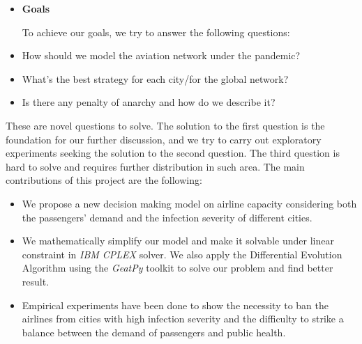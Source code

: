 \begin{itemize}    
    \item \textbf{Goals}
    
    To achieve our goals, we try to answer the following questions:
\end{itemize}



\begin{itemize}    
    \item How should we model the aviation network under the pandemic?
    \item What's the best strategy for each city/for the global network?
    \item Is there any penalty of anarchy and how do we describe it?
\end{itemize}


These are novel questions to solve. The solution to the first question is the foundation for our further discussion, and we try to carry out exploratory experiments seeking the solution to the second question. The third question is hard to solve and requires further distribution in such area. The main contributions of this project are the following:
\begin{itemize}
    \item We propose a new decision making model on airline capacity considering both the passengers' demand and the infection severity of different cities.
    \item We mathematically simplify our model and make it solvable under linear constraint in \emph{IBM CPLEX} solver. We also apply the Differential Evolution Algorithm using the \emph{GeatPy}\cite{geatpy} toolkit to solve our problem and find better result.
    
    \item Empirical experiments have been done to show the necessity to ban the airlines from cities with high infection severity and the difficulty to strike a balance between the demand of passengers and public health. 
\end{itemize}

